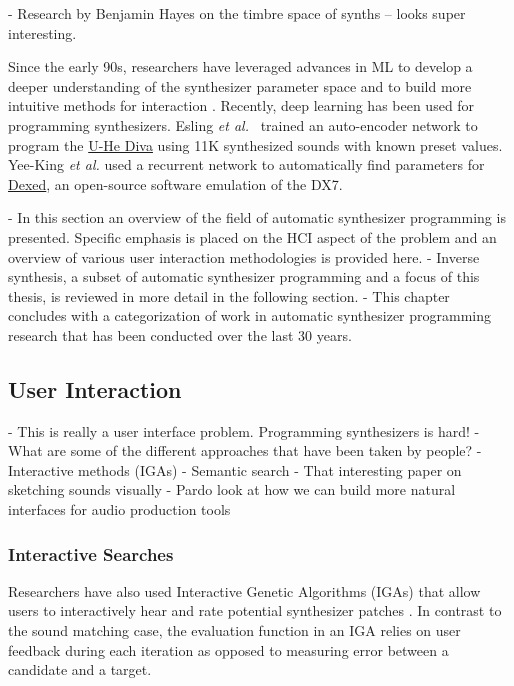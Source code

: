 - Research by Benjamin Hayes on the timbre space of synths -- looks super interesting.

Since the early 90s, researchers have leveraged advances in ML to develop a deeper understanding of the synthesizer parameter space and to build more intuitive methods for interaction \cite{horner1993machine}. Recently, deep learning has been used for programming synthesizers.  Esling {\em et al.}\ \cite{esling2020flow} trained an auto-encoder network to program the \href{https://u-he.com/products/diva/}{U-He Diva} using 11K synthesized sounds with known preset values. Yee-King {\em et al.} \cite{yee2018automatic} used a recurrent network to automatically find parameters for \href{https://asb2m10.github.io/dexed/}{Dexed}, an open-source software emulation of the DX7.

- In this section an overview of the field of automatic synthesizer programming is presented. Specific emphasis is placed on the HCI aspect of the problem and an overview of various user interaction methodologies is provided here.
- Inverse synthesis, a subset of automatic synthesizer programming and a focus of this thesis, is reviewed in more detail in the following section.
- This chapter concludes with a categorization of work in automatic synthesizer programming research that has been conducted over the last 30 years.

\subsection{User Interaction}
- This is really a user interface problem. Programming synthesizers is hard!
- What are some of the different approaches that have been taken by people?
- Interactive methods (IGAs)
- Semantic search
- That interesting paper on sketching sounds visually
- Pardo look at how we can build more natural interfaces for audio production tools \cite{pardo2019learning} 

\subsubsection{Interactive Searches}
Researchers have also used Interactive Genetic Algorithms (IGAs) that allow users to interactively hear and rate potential synthesizer patches \cite{johnson1999exploring, dahlstedt2001creating, yee2016use}. In contrast to the sound matching case, the evaluation function in an IGA relies on user feedback during each iteration as opposed to measuring error between a candidate and a target. 

